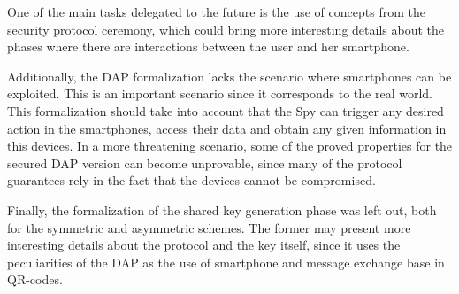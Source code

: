 One of the main tasks delegated to the future is the use of concepts from the security protocol ceremony, which could bring more interesting details about the phases where there are interactions between the user and her smartphone.

Additionally, the DAP formalization lacks the scenario where smartphones can be exploited. This is an important scenario since it corresponds to the real world. This formalization should take into account that the Spy can trigger any desired action in the smartphones, access their data and obtain any given information in this devices. In a more threatening scenario, some of the proved properties for the secured DAP version can become unprovable, since many of the protocol guarantees rely in the fact that the devices cannot be compromised.

Finally, the formalization of the shared key generation phase was left out, both for the symmetric and asymmetric schemes. The former may present more interesting details about the protocol and the key itself, since it uses the peculiarities of the DAP as the use of smartphone and message exchange base in QR-codes.
